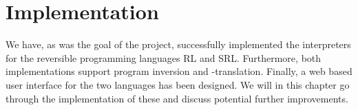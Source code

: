 \chapter{Implementation}

We have, as was the goal of the project, successfully implemented the interpreters for the reversible programming languages RL and SRL. Furthermore, both implementations support program inversion and -translation. Finally, a web based user interface for the two languages has been designed. We will in this chapter go through the implementation of these and discuss potential further improvements.








